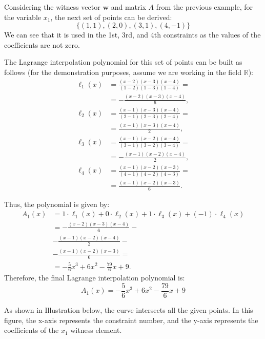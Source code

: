 \documentclass[../lecture-notes.tex]{subfiles}
\begin{document}
\begin{example}
    Considering the witness vector $\mathbf{w}$ and matrix $A$ from the previous example, for the variable
    $x_1$, the next set of points can be derived:
    \begin{equation*}
        \{(1,1), (2,0), (3,1), (4,-1)\}
    \end{equation*}
    We can see that it is used in the 1st, 3rd, and 4th constraints as the values of the coefficients
    are not zero.
    
    The Lagrange interpolation polynomial for this set of points can be built as follows (for the demonstration purposes, assume we are working in the field $\mathbb{R}$):
    \begin{align*}
        \ell_1(x) &= \frac{(x - 2)(x - 3)(x - 4)}{(1 - 2)(1 - 3)(1 - 4)} = \\ &= -\frac{(x - 2)(x - 3)(x - 4)}{6}, \\
        \ell_2(x) &= \frac{(x - 1)(x - 3)(x - 4)}{(2 - 1)(2 - 3)(2 - 4)} = \\ &= \frac{(x - 1)(x - 3)(x - 4)}{2}, \\
        \ell_3(x) &= \frac{(x - 1)(x - 2)(x - 4)}{(3 - 1)(3 - 2)(3 - 4)} = \\ &= -\frac{(x - 1)(x - 2)(x - 4)}{2}, \\
        \ell_4(x) &= \frac{(x - 1)(x - 2)(x - 3)}{(4 - 1)(4 - 2)(4 - 3)} = \\ &= \frac{(x - 1)(x - 2)(x - 3)}{6}.
    \end{align*}

    Thus, the polynomial is given by:
    \begin{align*}
        A_1(x) &= 1 \cdot \ell_1(x) + 0 \cdot \ell_2(x) + 1 \cdot \ell_3(x) + (-1) \cdot \ell_4(x) \\
        &= -\frac{(x - 2)(x - 3)(x - 4)}{6} - \\ &- \frac{(x - 1)(x - 2)(x - 4)}{2} - \\ &-\frac{(x - 1)(x - 2)(x - 3)}{6} = \\
        &= -\frac{5}{6}x^3 + 6x^2 - \frac{79}{6}x + 9.
    \end{align*}
    Therefore, the final Lagrange interpolation polynomial is:
    \begin{equation*}
        A_1(x) = -\frac{5}{6}x^3 + 6x^2 - \frac{79}{6}x + 9
    \end{equation*}

    As shown in Illustration below, the curve intersects all the given points.
    In this figure, the x-axis represents the constraint number, and the y-axis represents the 
    coefficients of the $x_1$ witness element.


\end{example}
\end{document}
